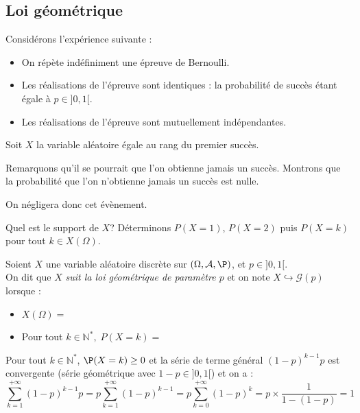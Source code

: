\documentclass[a4paper,10pt]{report}
\begin{document}
\subsection{Loi géométrique}
\noindent Considérons l'expérience suivante : 

\begin{itemize}
  \item On répète indéfiniment une épreuve de Bernoulli.
  \item Les réalisations de l'épreuve sont identiques : la probabilité de succès étant égale à $p \in ]0,1[$.
  \item Les réalisations de l'épreuve sont mutuellement indépendantes.
 \end{itemize}
 
\noindent Soit $X$ la variable aléatoire égale au rang du premier succès. 

\vspace{0.2cm}

\noindent Remarquons qu'il se pourrait que l'on obtienne jamais un succès. Montrons que la probabilité que l'on n'obtienne jamais un succès est nulle.

\vspace{5cm}

\noindent 
On négligera donc cet évènement.
\vspace{0.2cm}

\noindent Quel est le support de $X$? Déterminons $P(X=1)$, $P(X=2)$ puis $P(X=k)$ pour tout $k \in X(\Omega)$.

\vspace{9cm}

\begin{defin}
Soient $X$ une variable aléatoire discrète sur $(\Omega, \mathcal{A},\P)$, et $p \in ]0,1[$. \\
On dit que $X$ \textit{suit la loi géométrique de paramètre $p$} et on note $X \hookrightarrow \mathcal{G}(p)$ lorsque :
\begin{itemize}
 \item $X(\Omega)= \phantom{\mathbb{N}^*.}$
 \item Pour tout $k \in \mathbb{N}^*,\;P(X=k)= \phantom{(1-p)^{k-1} p.}$
\end{itemize}
\end{defin}

\medskip

\noindent Pour tout $k \in \mathbb{N}^*$, $\P(X=k) \geq 0$ et la série de terme général $(1-p)^{k-1} p$ est convergente (série géométrique avec $1-p \in ]0,1[$) et on a :
$$ \sum_{k=1}^{+ \infty} (1-p)^{k-1} p = p \sum_{k=1}^{+ \infty} (1-p)^{k-1} = p \sum_{k=0}^{+ \infty} (1-p)^{k} = p \times \dfrac{1}{1-(1-p)} = 1$$
\end{document}
